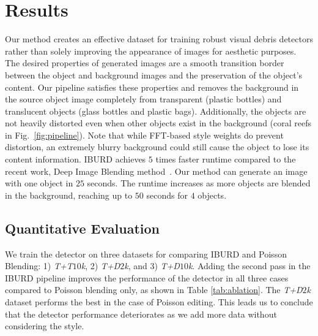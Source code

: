 \section{Results}
\label{sec:results}

Our method creates an effective dataset for training robust visual debris detectors rather than solely improving the appearance of images for aesthetic purposes. 
The desired properties of generated images are a smooth transition border between the object and background images and the preservation of the object's content.
Our pipeline satisfies these properties and removes the background in the source object image completely from transparent (\eg plastic bottles) and translucent objects (\eg glass bottles and plastic bags). 
Additionally, the objects are not heavily distorted even when other objects exist in the background (\eg coral reefs in Fig.~\ref{fig:pipeline}). Note that while FFT-based style weights do prevent distortion, an extremely blurry background could still cause the object to lose its content information.
IBURD achieves $5$ times faster runtime compared to the recent work, Deep Image Blending method~\cite{zhang_deep_2020}. Our method can generate an image with one object in $25$ seconds. The runtime increases as more objects are blended in the background, reaching up to $50$ seconds for $4$ objects.



\subsection{Quantitative Evaluation}

We train the detector on three datasets for comparing IBURD and Poisson Blending: 1) \textit{T+T$10$k}, 2) \textit{T+D$2$k}, and 3) \textit{T+D$10$k}. Adding the second pass in the IBURD pipeline improves the performance of the detector in all three cases compared to Poisson blending only, as shown in Table \ref{tab:ablation}. The \textit{T+D$2$k} dataset performs the best in the case of Poisson editing. This leads us to conclude that the detector performance deteriorates as we add more data without considering the style.

